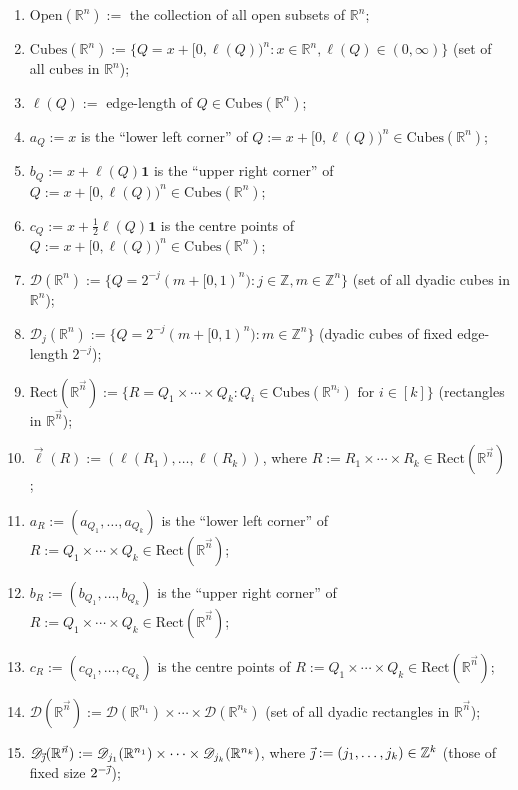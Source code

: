 \documentclass[11pt, reqno]{amsart}
\theoremstyle{definition}
\theoremstyle{remark}
\numberwithin{equation}{section}
\newcommand{\D}{\mathscr D}
\newcommand{\R}{\mathbb R}
\newcommand{\Z}{\mathbb Z}
\newcommand{\vj}{\vec{\textit{\j}}}
\newcommand{\vell}{\vec\ell}
\newcommand{\vn}{\vec n}
\newcommand{\one}{\mathbf{1}}
\newcommand{\Cubes}{\mathrm{Cubes}}
\newcommand{\Open}{\mathrm{Open}}
\newcommand{\Rect}{\mathrm{Rect}}
\begin{document}
\begin{enumerate}[]
\item $\Open(\R^{n}):=$ the collection of all open subsets of $\R^n$;

\item $\Cubes(\R^n):=\{Q=x+[0,\ell(Q))^n: x\in\R^n,\ell(Q)\in(0,\infty)\}$
(set of all cubes in $\R^n$);

\item $\ell(Q):=$ edge-length of $Q\in\Cubes(\R^n)$;

\item $a_Q:= x$ is the ``lower left corner'' of $Q:=x+[0,\ell(Q))^n\in\Cubes(\R^n)$;

\item $b_Q:= x+\ell(Q)\one$ is the ``upper right corner'' of $Q:=x+[0,\ell(Q))^n\in\Cubes(\R^n)$;

\item $c_Q:= x+\frac12\ell(Q)\one$ is the centre points of $Q:=x+[0,\ell(Q))^n\in\Cubes(\R^n)$;

\item $\D(\R^n):=\{Q=2^{-j}(m+[0,1)^n):j\in\Z,m\in\Z^n\}$ (set of all dyadic cubes in $\R^n$);

\item $\D_j(\R^n):=\{Q=2^{-j}(m+[0,1)^n):m\in\Z^n\}$
(dyadic cubes of fixed edge-length $2^{-j}$);

\item $\Rect(\R^{\vn}):=\{R=Q_1\times\cdots\times Q_k:Q_i\in\Cubes(\R^{n_i})\text{ for }i\in[k]\}$ (rectangles in $\R^{\vn}$);

\item $\vell(R):=(\ell(R_1),\ldots,\ell(R_k))$,
where $R:=R_1\times\cdots\times R_k\in\Rect(\R^{\vn})$;

\item $a_R:=(a_{Q_1},\ldots,a_{Q_k})$ is the
``lower left corner'' of $R:=Q_1\times\cdots\times Q_k\in\Rect(\R^{\vn})$;

\item $b_R:=(b_{Q_1},\ldots,b_{Q_k})$ is the ``upper right corner''
of $R:=Q_1\times\cdots\times Q_k\in\Rect(\R^{\vn})$;

\item $c_R:=(c_{Q_1},\ldots,c_{Q_k})$ is the centre points of
$R:=Q_1\times\cdots\times Q_k\in\Rect(\R^{\vn})$;

\item $\D(\R^{\vn}):=\D(\R^{n_1})\times\cdots\times
\D(\R^{n_k})$ (set of all dyadic rectangles in $\R^{\vn}$);

\item $\D_{\vj}(\R^{\vn}):=\D_{j_1}(\R^{n_1})\times\cdots
\times\D_{j_k}(\R^{n_k})$, where $\vj:=(j_1,\ldots,j_k)\in\Z^k$
(those of fixed size $2^{-\vj}$);


\end{enumerate}
\end{document}
